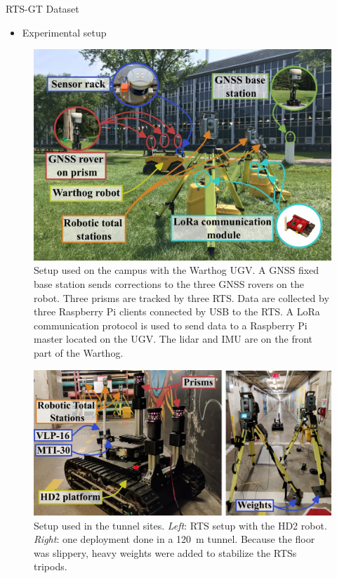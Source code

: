 \documentclass[final,hyperref={pdfpagelabels=false}]{beamer}
\begin{document}
\begin{frame}[t]
\begin{columns}[t]
\begin{column}{.465\textwidth}
\begin{block}{RTS-GT Dataset}
\begin{itemize}
    \item Experimental setup
\end{itemize}
    \vspace{4mm}
    \begin{figure}
        \includegraphics[width=0.735\linewidth]
            {figures/setup.jpg}%
        \captionsetup{width = 0.975\linewidth, justification=justified, name=Figure 1}
        \caption{
            Setup used on the campus with the Warthog \ac{UGV}. A \ac{GNSS} fixed base station sends corrections to the three \ac{GNSS} rovers on the robot. Three prisms are tracked by three \ac{RTS}. 
            Data are collected by three Raspberry Pi clients connected by USB to the \ac{RTS}. A LoRa communication protocol is used to send data to a Raspberry Pi master located on the \ac{UGV}. The lidar and \ac{IMU} are on the front part of the Warthog.}
        \label{fig:setup_outside}
    \end{figure}
    \vspace{4mm}
    \begin{figure}
        \includegraphics[width=0.82\linewidth]
            {figures/tunnels.jpg}%
        \captionsetup{width = 0.975\linewidth, justification=justified, name=Figure 2}
        \caption{
            Setup used in the tunnel sites. \emph{Left}: \ac{RTS} setup with the HD2 robot. \emph{Right}: one deployment done in a \SI{120}{\m} tunnel. Because the floor was slippery, heavy weights were added to stabilize the \acp{RTS} tripods.}
        \label{fig:setup_tunnels}
    \end{figure}


\end{block}
\end{column}
\end{columns}
\end{frame}
\end{document}
